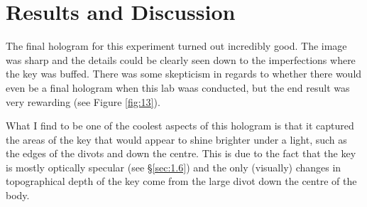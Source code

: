 \documentclass[12pt]{article}
\begin{document}
\section{Results and Discussion} \label{sec:3}

The final hologram for this experiment turned out incredibly good. The image was sharp and the details could be clearly seen down to the imperfections where the key was buffed. There was some skepticism in regards to whether there would even
be a final hologram when this lab waas conducted, but the end result was very rewarding (see Figure \ref{fig:13}). 

What I find to be one of the coolest aspects of this hologram is that it captured the areas of the key that would appear to shine brighter
under a light, such as the edges of the divots and down the centre. This is due to the fact that the key is mostly optically specular (see §\ref{sec:1.6}) and the only (visually) changes in topographical depth of the key come from the large divot down the centre of the body.
\end{document}

